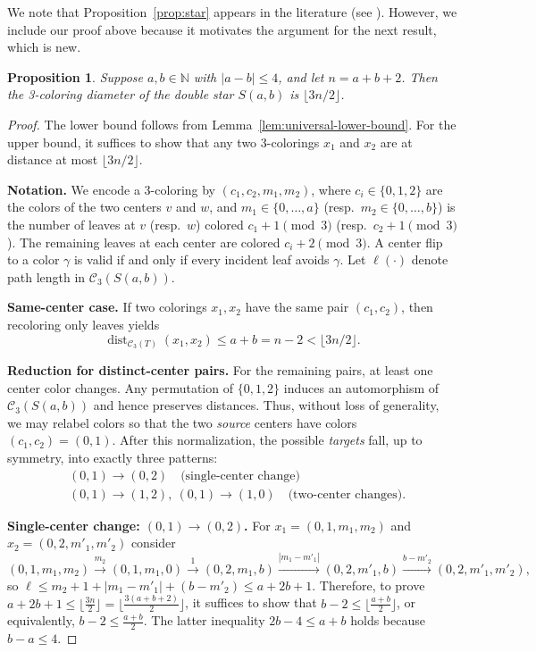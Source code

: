 \documentclass[12pt,reqno]{amsart}
\newtheorem{prop}[thm]{Proposition}
\theoremstyle{definition}
\newcommand{\C}{\mathcal{C}}
\newcommand{\dist}{\operatorname{dist}}
\begin{document}
We note that Proposition~\ref{prop:star} appears in the literature (see \cite[Proposition 2]{CvBC24}). However, we include our proof above because it motivates the argument for the next result, which is new.

\begin{prop}\label{prop:double-star}
Suppose $a,b\in\mathbb{N}$ with $|a-b|\le 4$, and let $n=a+b+2$. Then the 3-coloring diameter of the double star $S(a,b)$ is $\lfloor 3n/2\rfloor$.
\end{prop}

\begin{proof}
The lower bound follows from Lemma~\ref{lem:universal-lower-bound}. For the upper bound, it suffices to show that any two 3-colorings $x_1$ and $x_2$ are at distance at most $\lfloor 3n/2\rfloor$.

\textbf{Notation.}
We encode a 3-coloring by $(c_1,c_2,m_1,m_2)$, where $c_i\in\{0,1,2\}$ are the colors of the two centers $v$ and $w$, and $m_1\in\{0,\ldots,a\}$ (resp.\ $m_2\in\{0,\ldots,b\}$) is the number of leaves at $v$ (resp.\ $w$) colored $c_1+1\pmod{3}$ (resp.\ $c_2+1\pmod{3}$). The remaining leaves at each center are colored $c_i+2\pmod{3}$. A center flip to a color $\gamma$ is valid if and only if every incident leaf avoids $\gamma$. Let $\ell(\cdot)$ denote path length in $\C_3(S(a,b))$.

\textbf{Same-center case.}
If two colorings $x_1, x_2$ have the same pair $(c_1,c_2)$, then recoloring only leaves yields
\[
\dist_{\C_3(T)}(x_1,x_2)\le a+b=n-2<\lfloor 3n/2\rfloor.
\]

\textbf{Reduction for distinct-center pairs.}
For the remaining pairs, at least one center color changes. Any permutation of $\{0,1,2\}$ induces an automorphism of $\C_3(S(a,b))$ and hence preserves distances. Thus, without loss of generality, we may relabel colors so that the two \emph{source} centers have colors $(c_1,c_2)=(0,1)$. After this normalization, the possible \emph{targets} fall, up to symmetry, into exactly three patterns:
\begin{align*}
&(0,1)\to(0,2)\quad\text{(single-center change)} \\ 
& (0,1)\to(1,2),\ (0,1)\to(1,0)\quad\text{(two-center changes)}.
\end{align*}

\textbf{Single-center change: $(0,1)\to(0,2)$.}
For $x_1=(0,1,m_1,m_2)$ and $x_2=(0,2,m'_1,m'_2)$ consider
\[
(0,1,m_1,m_2)\xrightarrow{m_2}(0,1,m_1,0)\xrightarrow{1}(0,2,m_1,b)\xrightarrow{|m_1-m'_1|}(0,2,m'_1,b)\xrightarrow{b-m'_2}(0,2,m'_1,m'_2),
\]
so $\ell\le m_2+1+|m_1-m'_1|+(b-m'_2)\le a+2b+1$. Therefore, to prove $a+2b+1 \le \lfloor \frac{3n}{2}\rfloor = \lfloor\frac{3(a+b+2)}{2}\rfloor$, it suffices to show that $b-2 \le \Big\lfloor \frac{a+b}{2}\Big\rfloor$, or equivalently, $b-2 \le \frac{a+b}{2}$. The latter inequality $2b-4\leq a+b$ holds because $b-a\le 4$.


\end{proof}
\end{document}
